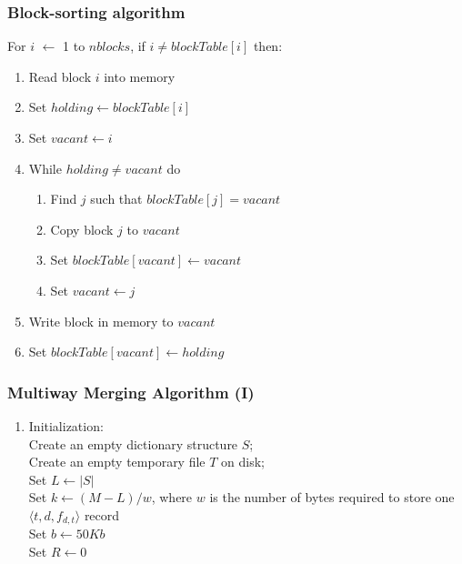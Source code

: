\documentclass[svgnames]{beamer}
\begin{document}

\newcommand{\la}{\ensuremath{\leftarrow}}

\begin{frame}
    \frametitle{Block-sorting algorithm}

    For $i$ $\la$ 1 to $nblocks$, if $i \neq blockTable[i]$ then:    
    \begin{enumerate}
    \item Read block $i$ into memory
    \item Set $holding \la blockTable[i]$
    \item Set $vacant \la i$
    \item While $holding \neq vacant$ do
        \begin{enumerate}
        \item Find $j$ such that $blockTable[j] = vacant$
        \item Copy block $j$ to $vacant$
        \item Set $blockTable[vacant] \la vacant$
        \item Set $vacant \la j$
        \end{enumerate}
    \item Write block in memory to $vacant$
    \item Set $blockTable[vacant] \la holding$
    \end{enumerate}
\end{frame}


\begin{frame}
    \frametitle{Multiway Merging Algorithm (I)}
    
    \begin{enumerate}
    \item Initialization:\\
        Create an empty dictionary structure $S$;\\
        Create an empty temporary file $T$ on disk;\\
        Set $L \la |S|$\\
        Set $k \la (M - L)/w$, where $w$ is the number of bytes required to
        store one $\langle t,d,f_{d,t} \rangle$ record\\
        Set $b \la 50 Kb$\\
        Set $R \la 0$\\
    \end{enumerate}
\end{frame}
\end{document}
